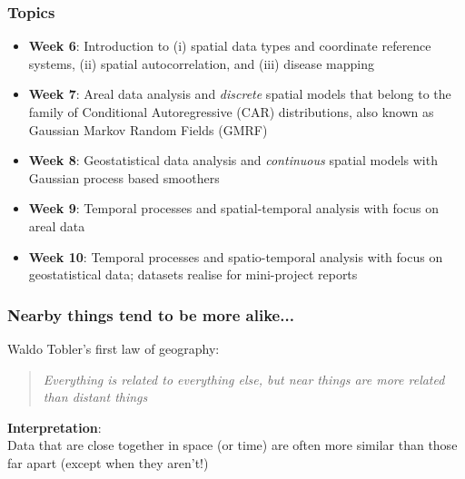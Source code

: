 \documentclass[12pt]{beamer}
\begin{document}
\begin{frame}
\frametitle{Topics}
\begin{itemize} \setlength\itemsep{\fill}
  \item \textbf{Week 6}: Introduction to (i) spatial data types and coordinate reference systems, (ii) spatial autocorrelation, and (iii) disease mapping
  \item \textbf{Week 7}: Areal data analysis and \emph{discrete} spatial models that belong to the family of \alert{Conditional Autoregressive (CAR) distributions}, also known as Gaussian Markov Random Fields (GMRF)
  \item \textbf{Week 8}: Geostatistical data analysis and \emph{continuous} spatial models with \alert{Gaussian process based smoothers}
  \item \textbf{Week 9}: Temporal processes and spatial-temporal analysis with focus on areal data
  \item \textbf{Week 10}: Temporal processes and spatio-temporal analysis with focus on geostatistical data; datasets realise for mini-project reports
    \end{itemize}
\end{frame}


\begin{frame}
\frametitle{Nearby things tend to be more alike...}
\vspace{15pt}
Waldo Tobler's first law of geography:
\begin{quote}{}
  \centering \emph{Everything is related to everything else, but near things are more related than distant things \citep{Tobler1970}}
\end{quote}

\vspace{15pt}
\textbf{Interpretation}:\\
Data that are close together in space (or time) are often more similar  than those far apart
(\alert{except when they aren't!})
\end{frame}
\end{document}
